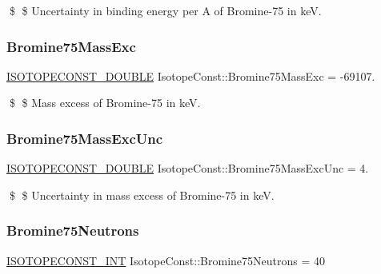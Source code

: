 \$ \$ Uncertainty in binding energy per A of Bromine-\/75 in keV. \mbox{\label{group___isotope_const-_bromine-_br75_gaf373b4ed31677d8b96d79d021f2b7c47}} 
\subsubsection{\texorpdfstring{Bromine75\+Mass\+Exc}{Bromine75MassExc}}
{\footnotesize\ttfamily \mbox{\hyperlink{group___isotope_const-_macros_ga8f45a7272ce02c0b4c65c44636ed719a}{I\+S\+O\+T\+O\+P\+E\+C\+O\+N\+S\+T\+\_\+\+D\+O\+U\+B\+LE}} Isotope\+Const\+::\+Bromine75\+Mass\+Exc = -\/69107.}

\$ \$ Mass excess of Bromine-\/75 in keV. \mbox{\label{group___isotope_const-_bromine-_br75_gac30f45c55819f6bddd2bf3967a82015f}} 
\subsubsection{\texorpdfstring{Bromine75\+Mass\+Exc\+Unc}{Bromine75MassExcUnc}}
{\footnotesize\ttfamily \mbox{\hyperlink{group___isotope_const-_macros_ga8f45a7272ce02c0b4c65c44636ed719a}{I\+S\+O\+T\+O\+P\+E\+C\+O\+N\+S\+T\+\_\+\+D\+O\+U\+B\+LE}} Isotope\+Const\+::\+Bromine75\+Mass\+Exc\+Unc = 4.}

\$ \$ Uncertainty in mass excess of Bromine-\/75 in keV. \mbox{\label{group___isotope_const-_bromine-_br75_ga919b891365963533a22ca8ce1e4ba65b}} 
\subsubsection{\texorpdfstring{Bromine75\+Neutrons}{Bromine75Neutrons}}
{\footnotesize\ttfamily \mbox{\hyperlink{group___isotope_const-_macros_ga5f18360b3e99483a35c32d789e62621c}{I\+S\+O\+T\+O\+P\+E\+C\+O\+N\+S\+T\+\_\+\+I\+NT}} Isotope\+Const\+::\+Bromine75\+Neutrons = 40}

